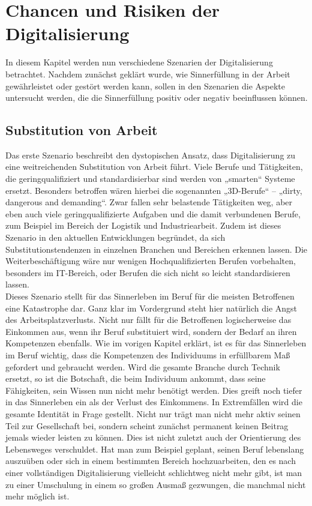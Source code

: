 \chapter{Chancen und Risiken der Digitalisierung}
In diesem Kapitel werden nun verschiedene Szenarien der Digitalisierung betrachtet. Nachdem zunächst geklärt wurde, wie Sinnerfüllung in der Arbeit gewährleistet oder gestört werden kann, sollen in den Szenarien die Aspekte untersucht werden, die die Sinnerfüllung positiv oder negativ beeinflussen können.
\section{Substitution von Arbeit}
Das erste Szenario beschreibt den dystopischen Ansatz, dass Digitalisierung zu eine weitreichenden Substitution von Arbeit führt. Viele Berufe und Tätigkeiten, die geringqualifiziert und standardisierbar sind werden von „smarten“ Systeme ersetzt. Besonders betroffen wären hierbei die sogenannten „3D-Berufe“ – „dirty, dangerous and demanding“. Zwar fallen sehr belastende Tätigkeiten weg, aber eben auch viele geringqualifizierte Aufgaben und die damit verbundenen Berufe, zum Beispiel im Bereich der Logistik und Industriearbeit. Zudem ist dieses Szenario in den aktuellen Entwicklungen begründet, da sich Substitutionstendenzen in einzelnen Branchen und Bereichen erkennen lassen. Die Weiterbeschäftigung wäre nur wenigen Hochqualifizierten Berufen vorbehalten, besonders im IT-Bereich, oder Berufen die sich nicht so leicht standardisieren lassen. \cite[S.182-183]{Eisenmann.2018}\\

Dieses Szenario stellt für das Sinnerleben im Beruf für die meisten Betroffenen eine Katastrophe dar. Ganz klar im Vordergrund steht hier natürlich die Angst des Arbeitsplatzverlusts. Nicht nur fällt für die Betroffenen logischerweise das Einkommen aus, wenn ihr Beruf substituiert wird, sondern der Bedarf an ihren Kompetenzen ebenfalls. Wie im vorigen Kapitel erklärt, ist es für das Sinnerleben im Beruf wichtig, dass die Kompetenzen des Individuums in erfüllbarem Maß gefordert und gebraucht werden. Wird die gesamte Branche durch Technik ersetzt, so ist die Botschaft, die beim Individuum ankommt, dass seine Fähigkeiten, sein Wissen nun nicht mehr benötigt werden. Dies greift noch tiefer in das Sinnerleben ein als der Verlust des Einkommens. In Extremfällen wird die gesamte Identität in Frage gestellt. Nicht nur trägt man nicht mehr aktiv seinen Teil zur Gesellschaft bei, sondern scheint zunächst permanent keinen Beitrag jemals wieder leisten zu können. Dies ist nicht zuletzt auch der Orientierung des Lebensweges verschuldet. Hat man zum Beispiel geplant, seinen Beruf lebenslang auszuüben oder sich in einem bestimmten Bereich hochzuarbeiten, den es nach einer vollständigen Digitalisierung vielleicht schlichtweg nicht mehr gibt, ist man zu einer Umschulung in einem so großen Ausmaß gezwungen, die manchmal nicht mehr möglich ist. 
